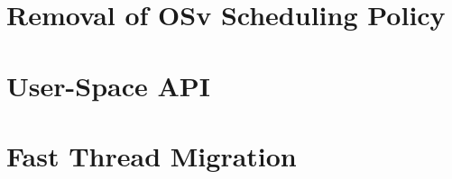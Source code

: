 \documentclass[12pt,a4paper]{book}
\begin{document}
\section{Removal of OSv Scheduling Policy}\label{ch:di:rmsched}
%   
\blindtext
\section{User-Space API}\label{ch:di:api}
\blindtext
\section{Fast Thread Migration}\label{ch:di:mig}
\blindtext
\end{document}
